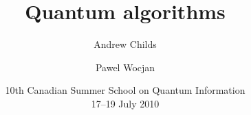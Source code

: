 \documentclass{beamer}
\title{Quantum algorithms}
\author{Andrew Childs\inst{1} \and Pawel Wocjan\inst{2}}
\institute{
\inst{1}
University of Waterloo
\and
\inst{2}
University of Central Florida}
\date{10th Canadian Summer School on Quantum Information \\ 17--19 July 2010}
\renewcommand{\>}{\rangle}
\newcommand{\<}{\langle}
\begin{document}
\begin{frame}
\titlepage
\end{frame}


%
%
%

%


\end{document}
